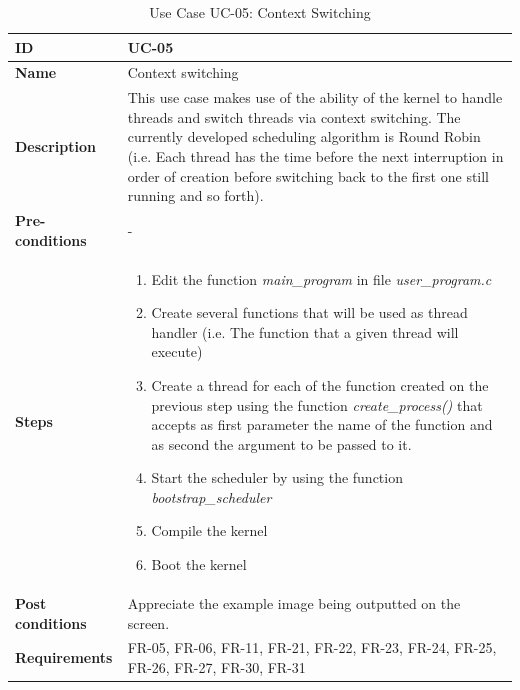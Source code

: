 \begin{table}[H]
    \centering
    \begin{tabular}{| p{3cm} | p{7cm} |}
    \hline
    \textbf{ID}             & UC-05 \\ \hline
    \textbf{Name}           & Context switching \\ \hline
    \textbf{Description}    & This use case makes use of the ability of the kernel to handle threads and switch threads via context switching. The currently developed scheduling algorithm is Round Robin (i.e. Each thread has the time before the next interruption in order of creation before switching back to the first one still running and so forth).
	\\ \hline
    \textbf{Pre-conditions} & - \\ \hline
    \textbf{Steps}          &   \begin{enumerate}
                                    \item Edit the function \textit{main\_program} in file \textit{user\_program.c}
                                    \item Create several functions that will be used as thread handler (i.e. The function that a given thread will execute)
                                    \item Create a thread for each of the function created on the previous step using the function \textit{create\_process()} that accepts as first parameter the name of the function and as second the argument to be passed to it.
                                    \item Start the scheduler by using the function \textit{bootstrap\_scheduler}
                                    \item Compile the kernel
                                    \item Boot the kernel
                                \end{enumerate}
 \\ \hline
    \textbf{Post conditions} & 	Appreciate the example image being outputted on the screen.
    							   	\\ \hline
    \textbf{Requirements}       &  FR-05, FR-06, FR-11, FR-21, FR-22, FR-23, FR-24, FR-25, FR-26, FR-27, FR-30, FR-31 \\ \hline
    \end{tabular}
    \caption{Use Case UC-05: Context Switching}
\end{table}


